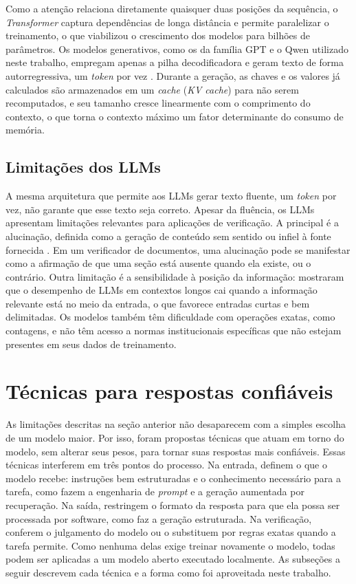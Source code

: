 Como a atenção relaciona diretamente quaisquer duas posições da sequência, o \textit{Transformer} captura dependências de longa distância e permite paralelizar o treinamento, o que viabilizou o crescimento dos modelos para bilhões de parâmetros. Os modelos generativos, como os da família GPT e o Qwen utilizado neste trabalho, empregam apenas a pilha decodificadora e geram texto de forma autorregressiva, um \textit{token} por vez \cite{Brown2020, Qwen2024}. Durante a geração, as chaves e os valores já calculados são armazenados em um \textit{cache} (\textit{KV cache}) para não serem recomputados, e seu tamanho cresce linearmente com o comprimento do contexto, o que torna o contexto máximo um fator determinante do consumo de memória.

\subsection{Limitações dos LLMs}

A mesma arquitetura que permite aos LLMs gerar texto fluente, um \textit{token} por vez, não garante que esse texto seja correto. Apesar da fluência, os LLMs apresentam limitações relevantes para aplicações de verificação. A principal é a alucinação, definida como a geração de conteúdo sem sentido ou infiel à fonte fornecida \cite{Ji2023}. Em um verificador de documentos, uma alucinação pode se manifestar como a afirmação de que uma seção está ausente quando ela existe, ou o contrário. Outra limitação é a sensibilidade à posição da informação:  mostraram que o desempenho de LLMs em contextos longos cai quando a informação relevante está no meio da entrada, o que favorece entradas curtas e bem delimitadas. Os modelos também têm dificuldade com operações exatas, como contagens, e não têm acesso a normas institucionais específicas que não estejam presentes em seus dados de treinamento.

\section{Técnicas para respostas confiáveis}
\label{sec:tecnicas}

As limitações descritas na seção anterior não desaparecem com a simples escolha de um modelo maior. Por isso, foram propostas técnicas que atuam em torno do modelo, sem alterar seus pesos, para tornar suas respostas mais confiáveis. Essas técnicas interferem em três pontos do processo. Na entrada, definem o que o modelo recebe: instruções bem estruturadas e o conhecimento necessário para a tarefa, como fazem a engenharia de \textit{prompt} e a geração aumentada por recuperação. Na saída, restringem o formato da resposta para que ela possa ser processada por software, como faz a geração estruturada. Na verificação, conferem o julgamento do modelo ou o substituem por regras exatas quando a tarefa permite. Como nenhuma delas exige treinar novamente o modelo, todas podem ser aplicadas a um modelo aberto executado localmente. As subseções a seguir descrevem cada técnica e a forma como foi aproveitada neste trabalho.


